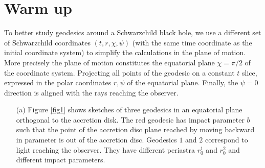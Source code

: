 \documentclass[10pt, a4paper]{article}
\begin{document}
\section{Warm up}
To better study geodesics around a Schwarzchild black hole, we use a different set of Schwarzchild coordinates $(t, r, \chi, \psi)$ (with the same time coordinate as the initial coordinate system) to simplify the calculations in the plane of motion. More precisely the plane of motion constitutes the equatorial plane $\chi = \pi/2$ of the coordinate system. Projecting all points of the geodesic on a constant $t$ slice, expressed in the polar coordinates $r, \psi$
of the equatorial plane. Finally, the $\psi = 0$ direction is aligned with the rays reaching the observer. 

\begin{enumerate}
  \item[(a)] Figure \ref{fig1} shows sketches of three geodesics in an equatorial plane orthogonal to the accretion disk. The red geodesic has impact parameter $b$ such that the point of the accretion disc plane reached by moving backward in parameter is out of the accretion disc. Geodesics $1$ and $2$ correspond to light reaching the observer. They have different periastra $r_0^1$ and $r_0^2$ and different impact parameters.
  \begin{figure}[h!]
    \centering
\end{figure}
\end{enumerate}
\end{document}
